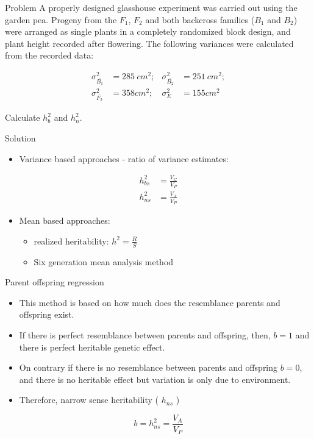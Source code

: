 \documentclass[11pt,dvipsnames,ignorenonframetext,aspectratio=169]{beamer}
\providecommand{\tightlist}{%
  \setlength{\itemsep}{0pt}\setlength{\parskip}{0pt}}
\begin{document}
\begin{frame}{Problem}
\protect\hypertarget{problem-1}{}
A properly designed glasshouse experiment was carried out using the
garden pea. Progeny from the \(F_1\), \(F_2\) and both backcross
families (\(B_1\) and \(B_2\)) were arranged as single plants in a
completely randomized block design, and plant height recorded after
flowering. The following variances were calculated from the recorded
data:

\[
\begin{aligned}
\sigma_{\bar{B_1}}^2 &= 285~cm^2; & \sigma_{\bar{B_2}}^2 &= 251~cm^2; \\
\sigma_{\bar{F_2}}^2 &= 358 cm^2; & \sigma_E^2 &= 155 cm^2
\end{aligned}
\]

Calculate \(h_b^2\) and \(h_n^2\).
\end{frame}

\begin{frame}{Solution}
\protect\hypertarget{solution-2}{}
\begin{itemize}
\tightlist
\item
  Variance based approaches - ratio of variance estimates:
\end{itemize}

\[
\begin{aligned}
h_{bs}^2 &= \frac{V_G}{V_P} \\ 
h_{ns}^2 &= \frac{V_A}{V_P}
\end{aligned}
\]

\begin{itemize}
\tightlist
\item
  Mean based approaches:

  \begin{itemize}
  \tightlist
  \item
    realized heritability: \(h^2 = \frac{R}{S}\)
  \item
    Six generation mean analysis method
  \end{itemize}
\end{itemize}
\end{frame}

\begin{frame}{Parent offspring regression}
\protect\hypertarget{parent-offspring-regression}{}
\begin{itemize}
\item
  This method is based on how much does the resemblance parents and
  offspring exist.
\item
  If there is perfect resemblance between parents and offspring, then,
  \(b = 1\) and there is perfect heritable genetic effect.
\item
  On contrary if there is no resemblance between parents and offspring
  \(b = 0\), and there is no heritable effect but variation is only due
  to environment.
\item
  Therefore, narrow sense heritability ( \(h_{ns}\) )
\end{itemize}

\[b= h_{ns}^2 = \frac{V_A}{V_P}\]
\end{frame}
\end{document}
